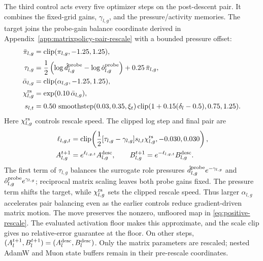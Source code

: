 \documentclass{article}
\newcommand{\clip}{\operatorname{clip}}
\newcommand{\smooth}{\operatorname{smoothstep}}
\begin{document}
The third control acts every five optimizer steps on the post-descent pair.  It
combines the fixed-grid gains, $\gamma_{l,g}$, and the pressure/activity
memories.  The target joins the probe-gain balance coordinate derived in
Appendix~\ref{app:matrixpolicy-pair-rescale} with a bounded pressure offset:
\begin{equation}
\begin{aligned}
    \bar{\pi}_{l,g}
    &=
    \clip(\pi_{l,g},-1.25,1.25),
    \\[2pt]
    \tau_{l,g}
    &=
    \frac{1}{2}
    \left(
    \log \hat d^{\rm probe}_{l,g}
    -
    \log \hat o^{\rm probe}_{l,g}
    \right)
    +0.25\,\bar{\pi}_{l,g},
    \\
    \bar{\alpha}_{l,g}
    &=
    \clip(\alpha_{l,g},-1.25,1.25),
    \\[2pt]
    \chi^{\rm rs}_{l,g}
    &=
    \exp(0.10\,\bar{\alpha}_{l,g}),
    \\[2pt]
    s_{l,t}
    &=
    0.50\,\smooth(0.03,0.35,\xi_t)
    \clip(1+0.15(\delta_l-0.5),0.75,1.25).
\end{aligned}
\label{eq:rescale-signals}
\end{equation}
Here $\chi^{\rm rs}_{l,g}$ controls rescale speed.  The clipped log step and
final pair are
\begin{equation}
\begin{aligned}
    \ell_{l,g,t}
    &=
    \clip\!\left(
    \frac{1}{2}[\tau_{l,g}-\gamma_{l,g}]s_{l,t}\chi^{\rm rs}_{l,g},
    -0.030,0.030
    \right),
    \\
    A_{l,g}^{t+1}
    &=
    e^{\ell_{l,g,t}}A_{l,g}^{\rm desc},
    \qquad
    B_{l,g}^{t+1}
    =
    e^{-\ell_{l,g,t}}B_{l,g}^{\rm desc}.
\end{aligned}
\label{eq:rescale-step}
\end{equation}
The first term of $\tau_{l,g}$ balances the surrogate role pressures
$\hat d^{\rm probe}_{l,g}e^{-\gamma_{l,g}}$ and
$\hat o^{\rm probe}_{l,g}e^{\gamma_{l,g}}$; reciprocal matrix scaling leaves both
probe gains fixed.  The pressure term shifts the target, while
$\chi^{\rm rs}_{l,g}$
sets the clipped rescale speed.  Thus larger $\alpha_{l,g}$ accelerates pair
balancing even as the earlier controls reduce gradient-driven matrix motion.
The move preserves the nonzero, unfloored map in
\eqref{eq:positive-rescale}.  The evaluated activation floor makes this
approximate, and the scale clip gives no relative-error guarantee at the floor.
On other steps, $(A_l^{t+1},B_l^{t+1})=(A_l^{\rm desc},B_l^{\rm desc})$.
Only the matrix parameters are rescaled; nested AdamW and Muon state buffers
remain in their pre-rescale coordinates.
\end{document}
